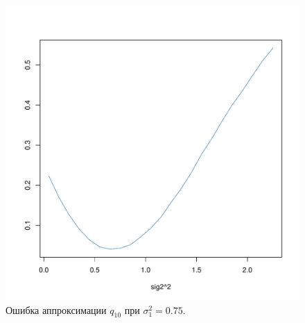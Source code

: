 \documentclass[specialist, substylefile = spbu.rtx,
subf,href,colorlinks=true, 12pt]{disser}
\begin{document}
\begin{figure}[!hhh]
	\begin{center}
		\begin{minipage}[h]{0.8\linewidth}
			\includegraphics[width=1\linewidth]{img_new/ris42.pdf}
			\caption{Ошибка аппроксимации $q_{10}$ при $\sigma_{1}^{2} = 0.75$.} %
			\label{ris4_2} %
		\end{minipage}	
	\end{center}
\end{figure}
\end{document}
